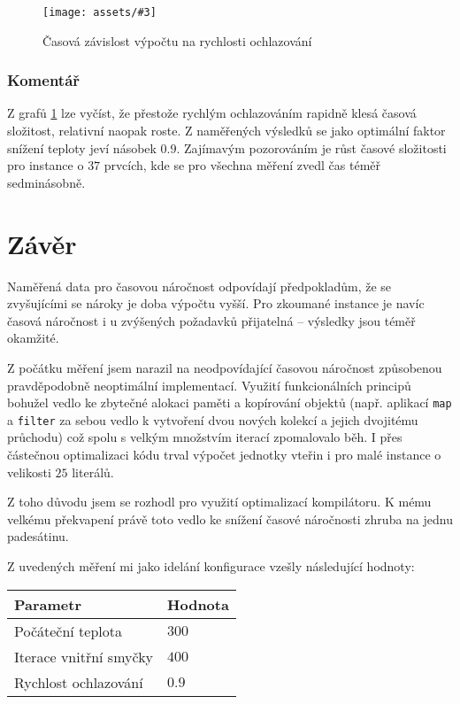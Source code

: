 \documentclass[czech]{article}
\newcommand{\image}[3]{
    \begin{figure}[H]
        \centering
        \texttt{[image: assets/\#3]}
        \caption{#2}
        \label{fig:#1}
    \end{figure}
}
\begin{document}
\image{annealing-factor}{Časová závislost výpočtu na rychlosti ochlazování}{annealing-factor.png}

\subsubsection*{Komentář}

Z grafů \ref{fig:annealing-factor} lze vyčíst, že přestože rychlým ochlazováním rapidně klesá časová složitost, relativní naopak roste.
Z naměřených výsledků se jako optimální faktor snížení teploty jeví násobek $0.9$.
Zajímavým pozorováním je růst časové složitosti pro instance o $37$ prvcích, kde se pro všechna měření zvedl čas téměř sedminásobně.

\section{Závěr}

Naměřená data pro časovou náročnost odpovídají předpokladům, že se zvyšujícími se nároky je doba výpočtu vyšší.
Pro zkoumané instance je navíc časová náročnost i u zvýšených požadavků přijatelná -- výsledky jsou téměř okamžité.

Z počátku měření jsem narazil na neodpovídající časovou náročnost způsobenou pravděpodobně neoptimální implementací.
Využití funkcionálních principů bohužel vedlo ke zbytečné alokaci paměti a kopírování objektů (např. aplikací \texttt{map} a \texttt{filter} za sebou vedlo k vytvoření dvou nových kolekcí a jejich dvojitému průchodu) což spolu s velkým množstvím iterací zpomalovalo běh.
I přes částečnou optimalizaci kódu trval výpočet jednotky vteřin i pro malé instance o velikosti $25$ literálů.

Z toho důvodu jsem se rozhodl pro využití optimalizací kompilátoru.
K mému velkému překvapení právě toto vedlo ke snížení časové náročnosti zhruba na jednu padesátinu.

Z uvedených měření mi jako idelání konfigurace vzešly následující hodnoty: \\

\begin{tabular}{ | l | l | }
    \hline
    Parametr & Hodnota \\ \hline \hline
    Počáteční teplota & $300$ \\
    Iterace vnitřní smyčky & $400$ \\
    Rychlost ochlazování & $0.9$ \\ \hline
\end{tabular}



\end{document}
